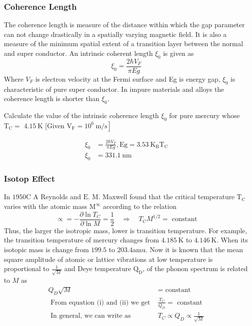 \subsubsection{Coherence Length}
The coherence length is measure of the distance within which the gap parameter can not change drastically in a spatially varying magnetic field. It is also a measure of the minimum spatial extent of a transition layer between the normal and super conductor. An intrinsic coherent length $\xi_{0}$ is given as
$$
\xi_{0}=\frac{2 \hbar V_{F}}{\pi E g}
$$
Where $V_{F}$ is electron velocity at the Fermi surface and Eg is energy gap, $\xi_{0}$ is characteristic of pure super conductor. In impure materials and alloys the coherence length is shorter than $\xi_{0}$.
\begin{exercise}
	 Calculate the value of the intrinsic coherence length $\xi_{0}$ for pure mercury whose $\mathrm{T}_{\mathrm{C}}=$ $4.15 \mathrm{~K}$ [Given $\left.\mathrm{V}_{\mathrm{F}}=10^{6} \mathrm{~m} / \mathrm{s}\right]$
\end{exercise}
\begin{answer}
	\begin{align*}
	\xi_{0}&=\frac{2 \hbar V_{F}}{\pi E g}, \mathrm{Eg}=3.53 \mathrm{~K}_{\mathrm{B}} \mathrm{T}_{\mathrm{C}}\\
	\xi_{0}&=331.1 \mathrm{~nm}
	\end{align*}
\end{answer}
\subsubsection{Isotop Effect}
In $1950 \mathrm{C}$ A Reynolds and $\mathrm{E}$. M. Maxwell found that the critical temperature $\mathrm{T}_{\mathrm{C}}$ varies with the atomic mass $\mathrm{M}^{\infty}$ according to the relation
$$\propto=-\frac{\partial \ln T_{C}}{\partial \ln M}=\frac{1}{2} \quad \Rightarrow \quad T_{C} M^{1 / 2}=\text{ constant}$$
Thus, the larger the isotropic mass, lower is transition temperature. For example, the transition temperature of mercury changes from $4.185 \mathrm{~K}$ to $4.146 \mathrm{~K}$. When its isotopic mass is change from $199.5$ to $203.4 \mathrm{amu}$. Now it is known that the mean square amplitude of atomic or lattice vibrations at low temperature is proportional to $\frac{1}{\sqrt{M}}$ and Deye temperature $\mathrm{Q}_{\mathrm{D}}$, of the phonon spectrum is related to $M$ as
\begin{align*}
Q_{D} \sqrt{M}&=\text { constant }\\
\text { From equation (i) and (ii) we get } &\frac{T_{C}}{Q_{D}}=\text { constant }\\
\text { In general, we can write as } &T_{C} \propto Q_{D} \propto \frac{1}{\sqrt{M}}
\end{align*}
